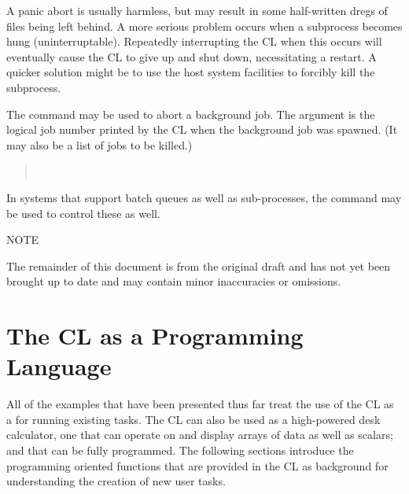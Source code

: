 \begin{quotation}\noindent
{}
\end{quotation}

\noindent
A panic abort is usually harmless, but may result in some half-written
dregs of files being left behind.  A more serious problem occurs when
a subprocess becomes hung (uninterruptable).  Repeatedly interrupting the
CL when this occurs will eventually cause the CL to give up and shut down,
necessitating a restart.  A quicker solution might be to use the host system
facilities to forcibly kill the subprocess.

The  command may be used to abort a background job. The 
argument is the logical job number printed by the CL when the background 
job was spawned. (It may also be a list of jobs to be killed.)

\begin{quotation}\noindent
{}  \\
\medskip
{} 
\end{quotation}

In systems that support batch queues as well as sub-processes,
the  command may be used to control these as well.

\newpage
\thispagestyle{empty}

\begin{center} \vspace*{1in}
\large NOTE
\end{center}
\vskip 1cm
\rm

The remainder of this document is from the original draft and has not yet
been brought up to date and may contain minor inaccuracies or omissions.

\newpage
\section{The CL as a Programming Language}

All of the examples that have been presented thus far treat the use
of the CL as a  for running existing tasks.
The CL can also be used as a high-powered desk calculator, one that
can operate on and display arrays of data as well as scalars;
and that can be fully programmed.
The following sections introduce the programming oriented functions
that are provided in the CL as background for understanding
the creation of new user tasks.  

